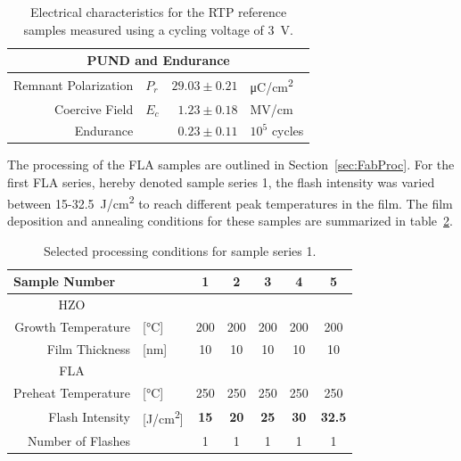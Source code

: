 \documentclass[11pt]{article}
\begin{document}
    \begin{table}[ht!]
        \centering
        \caption{Electrical characteristics for the RTP reference samples measured using a cycling voltage of \SI{3}{\volt}.}\label{tab:RTPref}
        \begin{tabular}{rlrl}
            \toprule
            \multicolumn{4}{c}{PUND and Endurance}\\\midrule
            Remnant Polarization & $P_r$ & $29.03 \pm 0.21$ & \si{\micro\coulomb/\centi\meter^2}\\
            Coercive Field & $E_c$ & $1.23 \pm 0.18$ & \si{\mega\volt/\centi\meter}\\
            Endurance & & $0.23 \pm 0.11$ & $10^5$ cycles\\\bottomrule
        \end{tabular}
    \end{table}

    The processing of the FLA samples are outlined in Section~\ref{sec:FabProc}. For the first FLA series, hereby denoted sample series 1, the flash intensity was varied between 15-\SI{32.5}{\joule/\centi\meter^2} to reach different peak temperatures in the film. The film deposition and annealing conditions for these samples are summarized in table~\ref{tab:FlashIntC}.

    \begin{table}[ht!]
        \centering
        \caption{Selected processing conditions for sample series 1.}\label{tab:FlashIntC}
        \begin{tabular}{rlccccc}
            \toprule
            \multicolumn{2}{l}{Sample Number} & 1 & 2 & 3 & 4 & 5 \\\midrule
            \multicolumn{1}{c}{HZO} & & & & & & \\
            Growth Temperature & [\si{\celsius}] & 200 & 200 & 200 & 200 & 200 \\
            Film Thickness & [\si{\nano\meter}] & 10 & 10 & 10 & 10 & 10 \\\midrule
            \multicolumn{1}{c}{FLA} & & & & & & \\
            Preheat Temperature & [\si{\celsius}] & 250 & 250 & 250 & 250 & 250 \\
            Flash Intensity & [\si{\joule/\centi\meter^2}] & \textbf{15} & \textbf{20} & \textbf{25} & \textbf{30} & \textbf{32.5} \\
            Number of Flashes & & 1 & 1 & 1 & 1 & 1 \\\bottomrule
        \end{tabular}
    \end{table}
\end{document}
